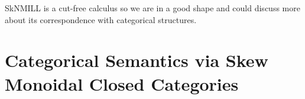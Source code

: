 \documentclass[submission,copyright,creativecommons]{eptcs}
\newcommand{\ldbc}{[\![}
\newcommand{\rdbc}{]\!]}
\newcommand{\tl}{\otimes \mathsf{L}}
\newcommand{\lright}{\multimap \mathsf{R}}
\newcommand{\pass}{\mathsf{pass}}
\newcommand{\unitl}{\mathsf{IL}}
\newcommand{\ot}{\otimes}
\newcommand{\lolli}{\multimap}
\newcommand{\niccolo}[1]{{\color{red}\textbf{Niccol{\`o}: }#1}}
\begin{document}
SkNMILL is a cut-free calculus so we are in a good shape and could discuss more about its correspondence with categorical structures.



\section{Categorical Semantics via Skew Monoidal Closed Categories}


\end{document}
